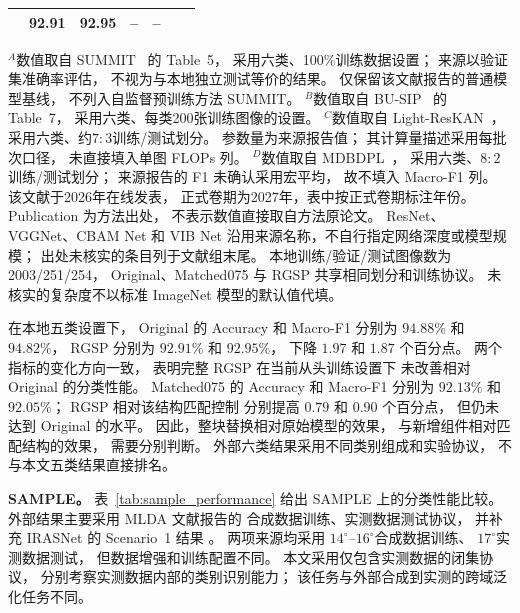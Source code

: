\begin{table}[!t]
\begin{tabular*}{\textwidth}{@{\extracolsep{\fill}}lccrrrr}
& 92.91 & 92.95 & -- & -- \\
\bottomrule
\end{tabular*}
\smallskip
\begin{minipage}{\linewidth}
\footnotesize
$^{A}$数值取自 SUMMIT~\cite{summit2025} 的 Table~5，
采用六类、100\%训练数据设置；
来源以验证集准确率评估，
不视为与本地独立测试等价的结果。
仅保留该文献报告的普通模型基线，
不列入自监督预训练方法 SUMMIT。
$^{B}$数值取自 BU-SIP~\cite{busip2025} 的 Table~7，
采用六类、每类200张训练图像的设置。
$^{C}$数值取自 Light-ResKAN~\cite{lightreskan2026}，
采用六类、约$7:3$训练/测试划分。
参数量为来源报告值；
其计算量描述采用每批次口径，
未直接填入单图 FLOPs 列。
$^{D}$数值取自 MDBDPL~\cite{mdbdpl2027}，
采用六类、$8:2$训练/测试划分；
来源报告的 F1 未确认采用宏平均，
故不填入 Macro-F1 列。
该文献于2026年在线发表，
正式卷期为2027年，表中按正式卷期标注年份。
Publication 为方法出处，
不表示数值直接取自方法原论文。
ResNet、VGGNet、CBAM Net 和 VIB Net
沿用来源名称，不自行指定网络深度或模型规模；
出处未核实的条目列于文献组末尾。
本地训练/验证/测试图像数为2003/251/254，
Original、Matched075 与 RGSP
共享相同划分和训练协议。
未核实的复杂度不以标准 ImageNet 模型的默认值代填。
\end{minipage}
\end{table}

在本地五类设置下，
Original 的 Accuracy 和 Macro-F1
分别为 $94.88\%$ 和 $94.82\%$，
RGSP 分别为 $92.91\%$ 和 $92.95\%$，
下降 $1.97$ 和 $1.87$ 个百分点。
两个指标的变化方向一致，
表明完整 RGSP 在当前从头训练设置下
未改善相对 Original 的分类性能。
Matched075 的 Accuracy 和 Macro-F1
分别为 $92.13\%$ 和 $92.05\%$；
RGSP 相对该结构匹配控制
分别提高 $0.79$ 和 $0.90$ 个百分点，
但仍未达到 Original 的水平。
因此，整块替换相对原始模型的效果，
与新增组件相对匹配结构的效果，
需要分别判断。
外部六类结果采用不同类别组成和实验协议，
不与本文五类结果直接排名。

\textbf{SAMPLE。}
表~\ref{tab:sample_performance}
给出 SAMPLE 上的分类性能比较。
外部结果主要采用 MLDA 文献报告的
合成数据训练、实测数据测试协议，
并补充 IRASNet 的 Scenario~1 结果
\cite{mlda2025,irasnet2025}。
两项来源均采用
$14^\circ$--$16^\circ$合成数据训练、
$17^\circ$实测数据测试，
但数据增强和训练配置不同。
本文采用仅包含实测数据的闭集协议，
分别考察实测数据内部的类别识别能力；
该任务与外部合成到实测的跨域泛化任务不同。

